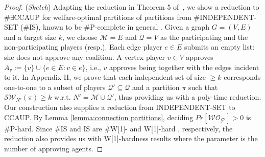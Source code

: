 \documentclass[letterpaper]{article} %
\begin{document}
\begin{proof}
(\textit{Sketch}) Adapting the reduction in Theorem 5 of~\cite{peters2016complexity}, we show a reduction to \#$\exists$CCAUP for welfare-optimal partitions of partitions from \#INDEPENDENT-SET (\#IS), known to be \#P-complete in general \cite{provan1983complexity}. Given a graph $G = (V,E)$ and a target size $k$, we choose $\mathcal{M} = E$ and $\mathcal{Q} = V$ as the participating and the non-participating players (resp.). Each edge player $e \in E$ submits an empty list: she does not approve any coalition. A vertex player $v \in V$ approves $A_v := \{v\} \cup \{e \in E : v \in e\}$, i.e., $v$ approves being together with the edges incident to it.  In Appendix H, we prove that each independent set of size $\geq k$ corresponds one-to-one to a subset of players $\mathcal{Q}' \subseteq \mathcal{Q}$ and a partition $\pi$ such that $\mathcal{SW}_{N'}(\pi) \geq k$ w.r.t. $N' = \mathcal{M} \cup \mathcal{Q}'$, thus providing us with a poly-time reduction. Our construction also supplies a reduction from INDEPENDENT-SET to CCAUP. By Lemma \ref{lemma:connection partitions}, deciding $Pr[\mathcal{WO}_{\mathcal{G}'}] > 0$ is \#P-hard. %
Since \#IS and IS are \#W[1]- and W[1]-hard \cite{downey1995fixed,curticapean2019fixed}, respectively, the reduction also provides us with W[1]-hardness results where the parameter is the number of approving agents. %
\end{proof}
\end{document}

